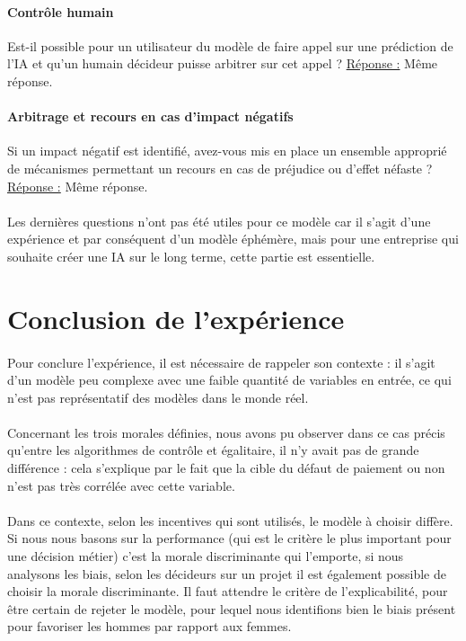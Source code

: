 \documentclass[10pt, french, a4paper]{report}
\begin{document}
\paragraph{Contrôle humain} 
Est-il possible pour un utilisateur du modèle de faire appel sur une prédiction de l'IA et qu'un humain décideur puisse arbitrer sur cet appel ?
\newline
\underline{Réponse :} Même réponse.

\paragraph{Arbitrage et recours en cas d'impact négatifs} 
Si un impact négatif est identifié, avez-vous mis en place un ensemble approprié de mécanismes permettant un recours en cas de préjudice ou d'effet néfaste ?
\newline
\underline{Réponse :} Même réponse.

\paragraph{}
Les dernières questions n'ont pas été utiles pour ce modèle car il s'agit d'une expérience et par conséquent d'un modèle éphémère, mais pour une entreprise qui souhaite créer une IA sur le long terme, cette partie est essentielle.

\section{Conclusion de l'expérience}

\paragraph{}
Pour conclure l'expérience, il est nécessaire de rappeler son contexte : il s'agit d'un modèle peu complexe avec une faible quantité de variables en entrée, ce qui n'est pas représentatif des modèles dans le monde réel. 

\paragraph{}
Concernant les trois morales définies, nous avons pu observer dans ce cas précis qu'entre les algorithmes de contrôle et égalitaire, il n'y avait pas de grande différence : cela s'explique par le fait que la cible du défaut de paiement ou non n'est pas très corrélée avec cette variable. 

\paragraph{}
Dans ce contexte, selon les incentives qui sont utilisés, le modèle à choisir diffère. Si nous nous basons sur la performance (qui est le critère le plus important pour une décision métier) c'est la morale discriminante qui l'emporte, si nous analysons les biais, selon les décideurs sur un projet il est également possible de choisir la morale discriminante. Il faut attendre le critère de l'explicabilité, pour être certain de rejeter le modèle, pour lequel nous identifions bien le biais présent pour favoriser les hommes par rapport aux femmes.
\end{document}
